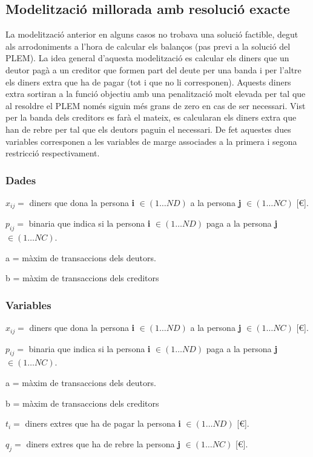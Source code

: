 \subsection{Modelització millorada amb resolució exacte}
La modelització anterior en alguns casos no trobava una solució factible, degut als arrodoniments a l'hora de calcular els balanços (pas previ a la solució del \ac{PLEM}).
La idea general d'aquesta modelització es calcular els diners que un deutor pagà a un creditor que formen part del deute per una banda i per l'altre els diners extra que ha de pagar (tot i que no li corresponen). Aquests diners extra sortiran a la funció objectiu amb una penalització molt elevada per tal que al resoldre el \ac{PLEM} només siguin més grans de zero en cas de ser necessari. Vist per la banda dels creditors es farà el mateix, es calcularan els diners extra que han de rebre per tal que els deutors paguin el necessari. De fet aquestes dues variables corresponen a les variables de marge associades a la primera i segona restricció respectivament.

\subsubsection{Dades}
\begin{description}
\item $x_{ij}=$ diners que dona la persona \textbf{i} $\in (1 \ldots ND)$ a la persona \textbf{j} $\in (1 \ldots NC)$  [€].
\item $p_{ij}=$ binaria que indica si la persona \textbf{i} $\in (1 \ldots ND)$ paga a la persona \textbf{j} $\in (1 \ldots NC)$.
\item a = màxim de transaccions dels deutors.
\item b = màxim de transaccions dels creditors
\end{description}

\subsubsection{Variables}
\begin{description}
\item $x_{ij}=$ diners que dona la persona \textbf{i} $\in (1 \ldots ND)$ a la persona \textbf{j} $\in (1 \ldots NC)$  [€].
\item $p_{ij}=$ binaria que indica si la persona \textbf{i} $\in (1 \ldots ND)$ paga a la persona \textbf{j} $\in (1 \ldots NC)$.
\item a = màxim de transaccions dels deutors.
\item b = màxim de transaccions dels creditors 
\item $t_{i}=$ diners extres que ha de pagar la persona \textbf{i} $\in (1 \ldots ND)$  [€].
\item $q_{j}=$ diners extres que ha de rebre la persona \textbf{j} $\in (1 \ldots NC)$  [€].
\end{description}

